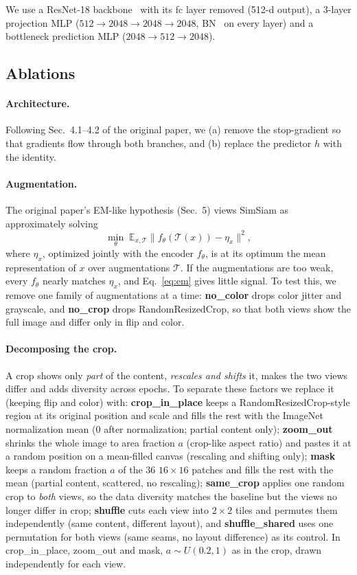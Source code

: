 \documentclass[10pt,twocolumn,letterpaper]{article}
\begin{document}
We use a ResNet-18 backbone~\cite{he2016resnet} with its fc layer removed (512-d output), a 3-layer projection MLP ($512\!\to\!2048\!\to\!2048\!\to\!2048$, BN~\cite{ioffe2015bn} on every layer) and a bottleneck prediction MLP ($2048\!\to\!512\!\to\!2048$).

\subsection{Ablations}
\paragraph{Architecture.}
Following Sec.~4.1--4.2 of the original paper, we (a) remove the stop-gradient so that gradients flow through both branches, and (b) replace the predictor $h$ with the identity.

\paragraph{Augmentation.}
The original paper's EM-like hypothesis (Sec.~5) views SimSiam as approximately solving
\begin{equation}
\min_\theta\; \mathbb{E}_{x,\mathcal{T}}\bigl\|f_\theta(\mathcal{T}(x))-\eta_x\bigr\|^2,
\label{eq:em}
\end{equation}
where $\eta_x$, optimized jointly with the encoder $f_\theta$, is at its optimum the mean representation of $x$ over augmentations $\mathcal{T}$.
If the augmentations are too weak, every $f_\theta$ nearly matches $\eta_x$, and Eq.~\eqref{eq:em} gives little signal.
To test this, we remove one family of augmentations at a time:
\textbf{no\_color} drops color jitter and grayscale, and \textbf{no\_crop} drops RandomResizedCrop, so that both views show the full image and differ only in flip and color.

\paragraph{Decomposing the crop.}
A crop shows only \emph{part} of the content, \emph{rescales and shifts} it, makes the two views differ and adds diversity across epochs. To separate these factors we replace it (keeping flip and color) with:
\textbf{crop\_in\_place} keeps a RandomResizedCrop-style region at its original position and scale and fills the rest with the ImageNet normalization mean (0 after normalization; partial content only);
\textbf{zoom\_out} shrinks the whole image to area fraction $a$ (crop-like aspect ratio) and pastes it at a random position on a mean-filled canvas (rescaling and shifting only);
\textbf{mask} keeps a random fraction $a$ of the 36 $16\!\times\!16$ patches and fills the rest with the mean (partial content, scattered, no rescaling);
\textbf{same\_crop} applies one random crop to \emph{both} views, so the data diversity matches the baseline but the views no longer differ in crop;
\textbf{shuffle} cuts each view into $2\!\times\!2$ tiles and permutes them independently (same content, different layout), and \textbf{shuffle\_shared} uses one permutation for both views (same seams, no layout difference) as its control.
In crop\_in\_place, zoom\_out and mask, $a\sim U(0.2,1)$ as in the crop, drawn independently for each view.
\end{document}
